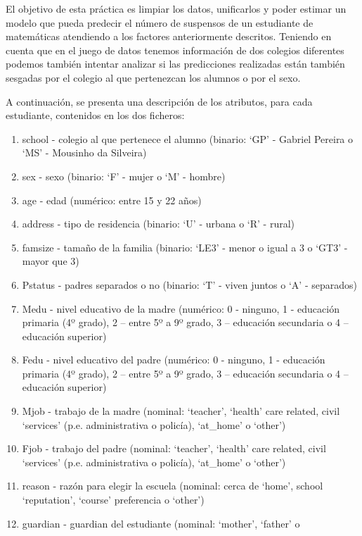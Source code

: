 \documentclass[]{article}
\providecommand{\tightlist}{%
  \setlength{\itemsep}{0pt}\setlength{\parskip}{0pt}}
\begin{document}
El objetivo de esta práctica es limpiar los datos, unificarlos y poder
estimar un modelo que pueda predecir el número de suspensos de un
estudiante de matemáticas atendiendo a los factores anteriormente
descritos. Teniendo en cuenta que en el juego de datos tenemos
información de dos colegios diferentes podemos también intentar analizar
si las predicciones realizadas están también sesgadas por el colegio al
que pertenezcan los alumnos o por el sexo.

A continuación, se presenta una descripción de los atributos, para cada
estudiante, contenidos en los dos ficheros:

\begin{enumerate}
\def\labelenumi{\arabic{enumi}.}
\tightlist
\item
  school - colegio al que pertenece el alumno (binario: `GP' - Gabriel
  Pereira o `MS' - Mousinho da Silveira)
\item
  sex - sexo (binario: `F' - mujer o `M' - hombre)
\item
  age - edad (numérico: entre 15 y 22 años)
\item
  address - tipo de residencia (binario: `U' - urbana o `R' - rural)
\item
  famsize - tamaño de la familia (binario: `LE3' - menor o igual a 3 o
  `GT3' - mayor que 3)
\item
  Pstatus - padres separados o no (binario: `T' - viven juntos o `A' -
  separados)
\item
  Medu - nivel educativo de la madre (numérico: 0 - ninguno, 1 -
  educación primaria (4º grado), 2 -- entre 5º a 9º grado, 3 --
  educación secundaria o 4 -- educación superior)
\item
  Fedu - nivel educativo del padre (numérico: 0 - ninguno, 1 - educación
  primaria (4º grado), 2 -- entre 5º a 9º grado, 3 -- educación
  secundaria o 4 -- educación superior)
\item
  Mjob - trabajo de la madre (nominal: `teacher', `health' care related,
  civil `services' (p.e. administrativa o policía), `at\_home' o
  `other')
\item
  Fjob - trabajo del padre (nominal: `teacher', `health' care related,
  civil `services' (p.e. administrativa o policía), `at\_home' o
  `other')
\item
  reason - razón para elegir la escuela (nominal: cerca de `home',
  school `reputation', `course' preferencia o `other')
\item
  guardian - guardian del estudiante (nominal: `mother', `father' o

\end{enumerate}
\end{document}
